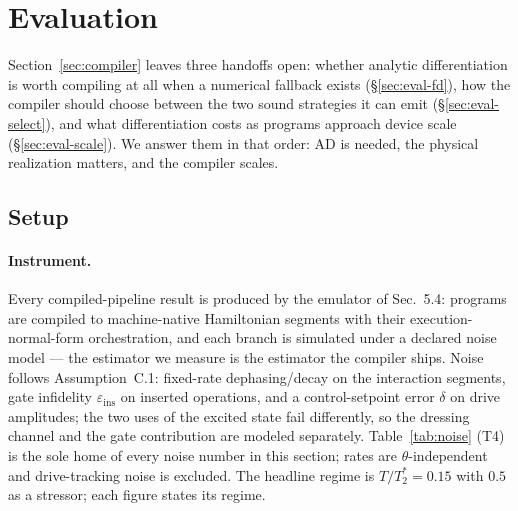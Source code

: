 \newcommand{\owed}[1]{{\color{red}\textbf{[owed: #1]}}}

\section{Evaluation}
\label{sec:eval}

Section~\ref{sec:compiler} leaves three handoffs open: whether analytic
differentiation is worth compiling at all when a numerical fallback exists
(\S\ref{sec:eval-fd}), how the compiler should choose between the two sound
strategies it can emit (\S\ref{sec:eval-select}), and what differentiation
costs as programs approach device scale (\S\ref{sec:eval-scale}). We answer
them in that order: AD is needed, the physical realization matters, and the
compiler scales.

\subsection{Setup}
\label{sec:eval-setup}

\paragraph{Instrument.} Every compiled-pipeline result is produced by the
emulator of Sec.~5.4: programs are compiled to machine-native Hamiltonian
segments with their execution-normal-form orchestration, and each branch is
simulated under a declared noise model --- the estimator we measure is the
estimator the compiler ships. Noise follows Assumption~C.1: fixed-rate
dephasing/decay on the interaction segments, gate infidelity
$\varepsilon_{\mathrm{ins}}$ on inserted operations, and a control-setpoint
error $\delta$ on drive amplitudes; the two uses of the excited state fail
differently, so the dressing channel and the gate contribution are modeled
separately. Table~\ref{tab:noise} (T4) is the sole home of every noise
number in this section; rates are $\theta$-independent and drive-tracking
noise is excluded. The headline regime is $T/T_2^{*}=0.15$ with $0.5$ as a
stressor; each figure states its regime.

